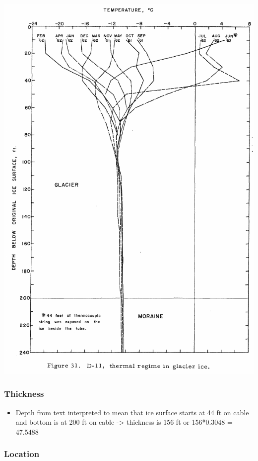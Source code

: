 \documentclass[article,a4paper,times,11pt,twoside]{article}
\begin{document}
\begin{center}
\includegraphics[width=.9\linewidth]{tuto_ramp/davis_1967_fig31.png}
\end{center}


\subsubsection{Thickness}
\label{sec:org73a04c0}

\begin{itemize}
\item Depth from text interpreted to mean that ice surface starts at 44 ft on cable and bottom is at 200 ft on cable -> thickness is 156 ft or 156*0.3048 = 47.5488
\end{itemize}

\subsubsection{Location}
\label{sec:orgddd86a0}
\end{document}
